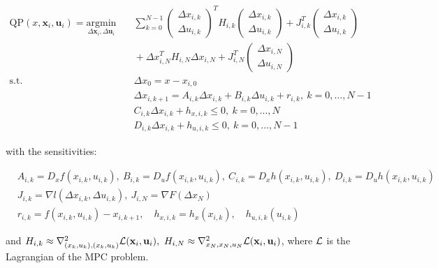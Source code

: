 \documentclass[12pt]{article}
\begin{document}
\begin{align*}
	\mathrm{QP}(x, \mathbf{x}_i, \mathbf{u}_i)=\underset{\Delta\mathbf{x}_i,\Delta\mathbf{u}_i}{\mathrm{argmin}} & \quad \sum_{k=0}^{N-1}\begin{pmatrix}\Delta x_{i,k}\\\Delta u_{i,k}\end{pmatrix}^TH_{i,k}\begin{pmatrix}\Delta x_{i,k}\\\Delta u_{i,k}\end{pmatrix}+J_{i,k}^T\begin{pmatrix}\Delta x_{i,k}\\\Delta u_{i,k}\end{pmatrix}\\
	&\quad +\Delta x_{i,N}^TH_{i,N}\Delta x_{i,N}+J_{i,N}^T\begin{pmatrix}\Delta x_{i,N}\\\Delta u_{i,N}\end{pmatrix}\\
	\text{s.t.} &\quad \Delta x_0=x-x_{i,0}\\
	&\quad \Delta x_{i,k+1}=A_{i,k}\Delta x_{i,k}+B_{i,k}\Delta u_{i,k}+r_{i,k},~k=0,\ldots,N-1\\
	&\quad C_{i,k}\Delta x_{i,k}+h_{x,i,k}\leq 0,~k=0,\ldots,N\\
	&\quad D_{i,k}\Delta x_{i,k}+h_{u,i,k}\leq 0,~k=0,\ldots,N-1
\end{align*}

\noindent with the sensitivities:

\begin{align*}
		&A_{i,k}=D_xf(x_{i,k}, u_{i,k}),~B_{i,k}=D_uf(x_{i,k}, u_{i,k}),~C_{i,k}=D_xh(x_{i,k}, u_{i,k}),~D_{i,k}=D_uh(x_{i,k}, u_{i,k})\\
		&J_{i,k}=\nabla l(\Delta x_{i,k},\Delta u_{i,k}),~J_{i,N}=\nabla F(\Delta x_N)\\
		&r_{i,k}=f(x_{i,k}, u_{i,k})-x_{i,k+1},\quad h_{x,i,k}=h_x(x_{i,k}),\quad h_{u,i,k}(u_{i,k})
\end{align*}

\noindent and $H_{i,k}\approx \nabla^2_{(x_k,u_k),(x_k,u_k)}\mathcal{L}(\mathbf{x}_i,\mathbf{u}_i),~H_{i,N}\approx\nabla^2_{x_N,x_N,u_N}\mathcal{L}(\mathbf{x}_i,\mathbf{u}_i)$, where $\mathcal{L}$ is the Lagrangian of the MPC problem.
\end{document}
